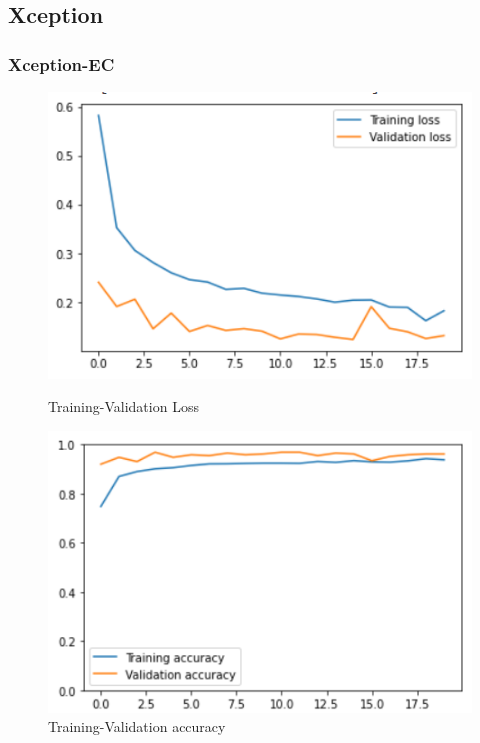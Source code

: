 \documentclass[11pt,a4paper]{article}
\theoremstyle{definition}
\begin{document}
\subsection{Xception}

\subsubsection{Xception-EC}

\begin{figure}[H]
  \centering
  \begin{minipage}[b]{0.45\textwidth}
    \includegraphics[scale=0.75]{./images/xception1loss}
	\caption{Training-Validation Loss}
  \end{minipage}
  \hfill
  \begin{minipage}[b]{0.45\textwidth}
    \includegraphics[scale=0.75]{./images/xception1acc}
	\caption{Training-Validation accuracy}
  \end{minipage}
\end{figure}
\end{document}
